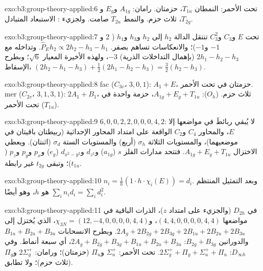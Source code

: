 \begin{solution}{exo:b3:group-theory-applied:6}
تحت الأحمر: النمطان $T_{1u}$، حزمتان. رامان: $A_{1g}$ و$E_g$ و$T_{2g}$، ثلاث حزم.
والنمط $T_{2u}$ صامت. ولجزيء  : الاستبعاد المتبادل.
\end{solution}

\begin{solution}{exo:b3:group-theory-applied:7}
تحت $E$ و$C_3$ و$C_3^2$ تنتقل الدالة $h_2$ إلى $h_2$ و$h_3$ و$h_1$ ( 2
و$-1$ و$-1$)؛ والانعكاسات تساهم بصفر. $\hat P_Eh_2 \propto 2h_2 - h_3 - h_1$.
وتداخله مع $2h_1 - h_2 - h_3$ (بإهمال التداخلات الذرية) $-3$، 
ولهذه الأخيرة المعيار $\sqrt6$؛ وبطرح الإسقاط، $(2h_2 - h_1 - h_3) +
\frac12(2h_1 - h_2 - h_3) = \frac32(h_2 - h_3)$.
\end{solution}

\begin{solution}{exo:b3:group-theory-applied:8}
fac ($C_{3v}$،  $3, 0, 1$): $A_1 + E$، حزمتان في تحت الأحمر. mer ($C_{2v}$،
 $3, 1, 3, 1$): $2A_1 + B_1$، ثلاث حزم.  ($O_h$): $A_{1g} + E_g
+ T_{1u}$، حزمة واحدة في تحت الأحمر ($T_{1u}$).
\end{solution}

\begin{solution}{exo:b3:group-theory-applied:9}
 $6, 0, 0, 2, 2, 0, 0, 0, 4, 2$: لا يُبقي ربائطَ في مواضعها إلا $E$، والمحاور $C_4$ و$C_2$ الواقعة على امتداد
المحاور الإحداثية (ربيطتان باقيتان في موضعيهما)، والمستويات الثلاثة $\sigma_h$ (أربع) والمستويات الستة $\sigma_d$
(اثنتان). ويعطي الاختزال $A_{1g} + E_g + T_{1u}$. فتتحد مدارات الفلز $s$
($a_{1g}$) و$d_{z^2}$ و$d_{x^2-y^2}$ ($e_g$) و$p_x$ و$p_y$ و$p_z$ ($t_{1u}$)؛
وتبقى $t_{2g}$ غير رابطة.
\end{solution}

\begin{solution}{exo:b3:group-theory-applied:10}
$n_i = \frac1h(1\cdot h\cdot\chi_i(E)) = d_i$. وبعد التمثيل المنتظم
هو $h$، وهو أيضًا $\sum_in_id_i = \sum_id_i^2$.
\end{solution}

\begin{solution}{exo:b3:group-theory-applied:11}
في $D_{2h}$ (والجزيء على امتداد $z$)، الذرات الباقية في مواضعها $(4, 4, 0, 0, 0, 0, 4, 4)$، و$\chi_{3N}
= (12, -4, 0, 0, 0, 0, 4, 4)$، الذي يُختزل إلى $2A_g + 2B_{2g} + 2B_{3g} + 2B_{1u} + 2B_{2u}
+ 2B_{3u}$. وبطرح الانسحابات $B_{1u} + B_{2u} + B_{3u}$ والدورانين
$B_{2g} + B_{3g}$: $2A_g + B_{2g} + B_{3g} + B_{1u} + B_{2u} + B_{3u}$، أي سبعة أنماط.
وفي $D_{\infty h}$: $2\Sigma_g^+ + \Pi_g + \Sigma_u^+ + \Pi_u$. تحت الأحمر: $\Sigma_u^+$ و$\Pi_u$
(حزمتان)؛ ورامان: $2\Sigma_g^+$ و$\Pi_g$ (ثلاث حزم)؛ ولا تطابق.
\end{solution}

